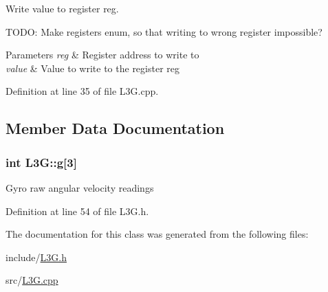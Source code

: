 \-Write value to register reg. 

\-T\-O\-D\-O\-: \-Make registers enum, so that writing to wrong register impossible?


\begin{DoxyParams}{\-Parameters}
{\em reg} & \-Register address to write to \\
\hline
{\em value} & \-Value to write to the register reg \\
\hline
\end{DoxyParams}


\-Definition at line 35 of file \-L3\-G.\-cpp.



\subsection{\-Member \-Data \-Documentation}
\hypertarget{class_l3_g_a0cb874e50a2ea4753d81e9a46c7e45ce}{
\subsubsection[{g}]{\setlength{\rightskip}{0pt plus 5cm}int {\bf \-L3\-G\-::g}\mbox{[}3\mbox{]}}}\label{class_l3_g_a0cb874e50a2ea4753d81e9a46c7e45ce}
\-Gyro raw angular velocity readings 

\-Definition at line 54 of file \-L3\-G.\-h.



\-The documentation for this class was generated from the following files\-:\begin{DoxyCompactItemize}
\item 
include/\hyperlink{_l3_g_8h}{\-L3\-G.\-h}\item 
src/\hyperlink{_l3_g_8cpp}{\-L3\-G.\-cpp}\end{DoxyCompactItemize}

